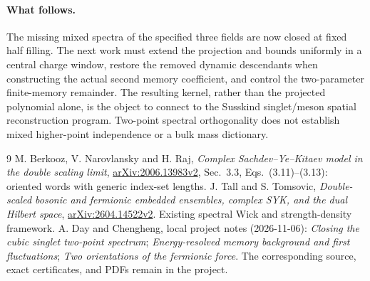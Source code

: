 \documentclass[11pt,a4paper]{article}
\begin{document}
\paragraph{What follows.}
The missing mixed spectra of the specified three fields are now
closed at fixed half filling. The next work must extend the
projection and bounds uniformly in a central charge window,
restore the removed dynamic descendants when constructing the
actual second memory coefficient, and control the two-parameter
finite-memory remainder. The resulting kernel, rather than the
projected polynomial alone, is the object to connect to the
Susskind singlet/meson spatial reconstruction program.
Two-point spectral orthogonality does not establish mixed
higher-point independence or a bulk mass dictionary.

\begin{thebibliography}{9}\small
{} M. Berkooz, V. Narovlansky and H. Raj,
\emph{Complex Sachdev--Ye--Kitaev model in the double scaling limit},
\href{https://arxiv.org/html/2006.13983v2}{arXiv:2006.13983v2},
Sec.~3.3, Eqs.~(3.11)--(3.13): oriented words with generic index-set lengths.
 J. Tall and S. Tomsovic,
\emph{Double-scaled bosonic and fermionic embedded ensembles,
complex SYK, and the dual Hilbert space},
\href{https://arxiv.org/html/2604.14522v2}{arXiv:2604.14522v2}.
Existing spectral Wick and strength-density framework.
 A. Day and Chengheng, local project notes (2026-11-06):
\emph{Closing the cubic singlet two-point spectrum};
\emph{Energy-resolved memory background and first fluctuations};
\emph{Two orientations of the fermionic force}.
The corresponding source, exact certificates, and PDFs remain in the project.
\end{thebibliography}
\end{document}
